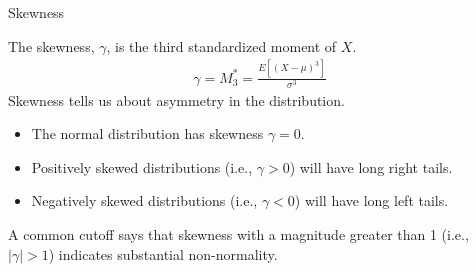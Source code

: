 \documentclass{beamer}\usepackage[]{graphicx}\usepackage[]{color}
\begin{document}

\begin{frame}{Skewness}
  
  The skewness, $\gamma$, is the third standardized moment of $X$.
  \begin{align*}
    \gamma = M_3^* = \frac{E\left[(X - \mu)^3\right]}{\sigma^3}
  \end{align*}
  Skewness tells us about asymmetry in the distribution.
  \begin{itemize}
  \item The normal distribution has skewness $\gamma = 0$.
  \item Positively skewed distributions (i.e., $\gamma > 0$) will have long 
    right tails.
  \item Negatively skewed distributions (i.e., $\gamma < 0$) will have long left 
    tails.
  \end{itemize}
  \vb
  A common cutoff says that skewness with a magnitude greater than 1 (i.e., 
  $|\gamma| > 1$) indicates substantial non-normality.
  
\end{frame}

\watermarkoff %
\end{document}
